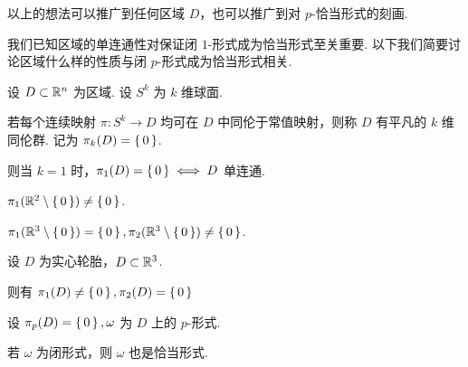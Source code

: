 \begin{hint}
    以上的想法可以推广到任何区域 $D$，也可以推广到对 $p$-恰当形式的刻画.

    我们已知区域的单连通性对保证闭 $1$-形式成为恰当形式至关重要. 以下我们简要讨论区域什么样的性质与闭 $p$-形式成为恰当形式相关.
\end{hint}

\begin{definition}
    设 $D\subset\mathbb{R}^n$ 为区域. 设 $S^k$ 为 $k$ 维球面.

    若每个连续映射 $\pi:S^k\to D$ 均可在 $D$ 中同伦于常值映射，则称 $D$ 有平凡的 $k$ 维同伦群. 记为 $\pi_k(D)=\set{0}$.
\end{definition}

则当 $k=1$ 时，$\pi_1(D)=\set{0}\iff D$ 单连通.

\begin{example}
    $\pi_1(\mathbb{R}^2\setminus\set{0})\ne\set{0}$.

    $\pi_1(\mathbb{R}^3\setminus\set{0})=\set{0},\pi_2(\mathbb{R}^3\setminus\set{0})\ne\set{0}$.

    设 $D$ 为实心轮胎，$D\subset\mathbb{R}^3$.

    则有 $\pi_1(D)\ne\set{0},\pi_2(D)=\set{0}$
\end{example}

\begin{property}
    设 $\pi_p(D)=\set{0},\omega$ 为 $D$ 上的 $p$-形式.

    若 $\omega$ 为闭形式，则 $\omega$ 也是恰当形式.
\end{property}